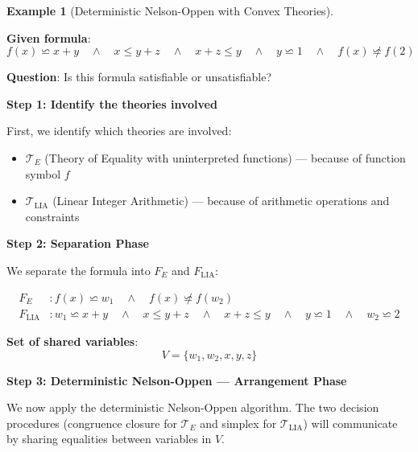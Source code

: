 \documentclass[11pt,a4paper]{article}
\theoremstyle{definition}
\newtheorem{example}{Example}[section]
\theoremstyle{plain}
\theoremstyle{remark}
\begin{document}
\begin{example}[Deterministic Nelson-Oppen with Convex Theories]
\begin{tcolorbox}[colback=blue!5!white,colframe=blue!75!black,title=\textbf{Example 1: Combining $\mathcal{T}_E$ and $\mathcal{T}_{\text{LIA}}$},breakable]
\textbf{Given formula}:
\[
f(x) \backsimeq x + y \quad \wedge \quad x \leq y + z \quad \wedge \quad x + z \leq y \quad \wedge \quad y \backsimeq 1 \quad \wedge \quad f(x) \not\backsimeq f(2)
\]

\textbf{Question}: Is this formula satisfiable or unsatisfiable?

\vspace{0.5em}

\textbf{Step 1: Identify the theories involved}

First, we identify which theories are involved:
\begin{itemize}
    \item $\mathcal{T}_E$ (Theory of Equality with uninterpreted functions) — because of function symbol $f$
    \item $\mathcal{T}_{\text{LIA}}$ (Linear Integer Arithmetic) — because of arithmetic operations and constraints
\end{itemize}

\vspace{0.5em}

\textbf{Step 2: Separation Phase}

We separate the formula into $F_E$ and $F_{\text{LIA}}$:

\begin{align*}
F_E &: f(x) \backsimeq w_1 \quad \wedge \quad f(x) \not\backsimeq f(w_2) \\
F_{\text{LIA}} &: w_1 \backsimeq x + y \quad \wedge \quad x \leq y + z \quad \wedge \quad x + z \leq y \quad \wedge \quad y \backsimeq 1 \quad \wedge \quad w_2 \backsimeq 2
\end{align*}

\textbf{Set of shared variables}:
\[
V = \{w_1, w_2, x, y, z\}
\]

\vspace{0.5em}

\textbf{Step 3: Deterministic Nelson-Oppen — Arrangement Phase}

We now apply the deterministic Nelson-Oppen algorithm. The two decision procedures (congruence closure for $\mathcal{T}_E$ and simplex for $\mathcal{T}_{\text{LIA}}$) will communicate by sharing equalities between variables in $V$.


\end{tcolorbox}
\end{example}
\end{document}
